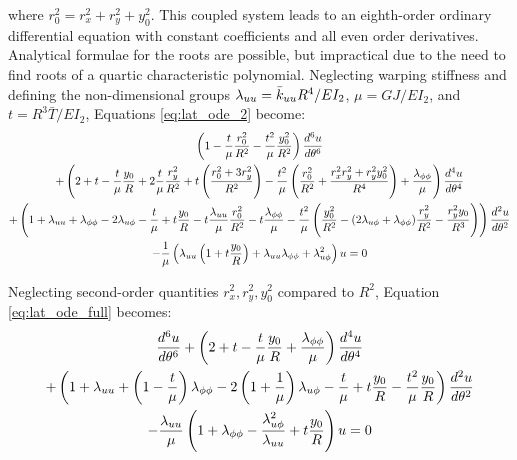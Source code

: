 \documentclass[\rootdir/thesis.tex]{subfiles}
\begin{document}
where $r_0^2 = r_x^2+r_y^2+y_0^2$. This coupled system leads to an eighth-order ordinary differential equation with constant coefficients and all even order derivatives. Analytical formulae for the roots are possible, but impractical due to the need to find roots of a quartic characteristic polynomial. Neglecting warping stiffness and defining the non-dimensional groups $\lambda_{uu}=\bar{k}_{uu} R^4/EI_2$, $\mu=GJ/EI_2$, and $t=R^3\bar{T}/EI_2$, Equations \eqref{eq:lat_ode_2} become:
\begin{multline}
\label{eq:lat_ode_full}
  \left(1-\frac{t}{\mu}\frac{r_0^2}{R^2} - \frac{t^2}{\mu}\frac{y_0^2}{R^2}\right)\frac{d^6u}{d\theta^6}\\
  +\left(2+t-\frac{t}{\mu}\frac{y_0}{R} + 2\frac{t}{\mu}\frac{r_y^2}{R^2}
         +t\left(\frac{r_0^2 + 3r_y^2}{R^2}\right)
         -\frac{t^2}{\mu}\left(\frac{r_0^2}{R^2}+\frac{r_x^2r_y^2+r_y^2y_0^2}{R^4}\right)
         +\frac{\lambda_{\phi\phi}}{\mu}\right) \frac{d^4u}{d\theta^4}\\
  +\left(1+\lambda_{uu}+\lambda_{\phi\phi}-2\lambda_{u\phi}
         -\frac{t}{\mu}+t\frac{y_0}{R}-t\frac{\lambda_{uu}}{\mu}\frac{r_0^2}{R^2}
         -t\frac{\lambda_{\phi\phi}}{\mu}
         -\frac{t^2}{\mu}\left(\frac{y_0^2}{R^2}-(2\lambda_{u\phi}+\lambda_{\phi\phi})\frac{r_y^2}{R^2} - \frac{r_y^2y_0}{R^3}\right)
         \right)\frac{d^2u}{d\theta^2}\\
  -\frac{1}{\mu}\left(\lambda_{uu}\left(1+t\frac{y_0}{R}\right)
                      +\lambda_{uu}\lambda_{\phi\phi} + \lambda_{u\phi}^2\right)u = 0
\end{multline}

Neglecting second-order quantities $r_x^2,r_y^2,y_0^2$ compared to $R^2$, Equation \eqref{eq:lat_ode_full} becomes:
\begin{multline}
\label{eq:lat_ode}
  \frac{d^6u}{d\theta^6}
  +\left(2 + t - \frac{t}{\mu}\frac{y_0}{R}
         +\frac{\lambda_{\phi\phi}}{\mu}\right) \frac{d^4u}{d\theta^4}\\
  +\left(1 + \lambda_{uu} + \left(1-\frac{t}{\mu}\right)\lambda_{\phi\phi}
         -2\left(1 + \frac{1}{\mu}\right)\lambda_{u\phi}
         -\frac{t}{\mu}+t\frac{y_0}{R}
         -\frac{t^2}{\mu}\frac{y_0}{R}\right)\frac{d^2u}{d\theta^2}\\
  -\frac{\lambda_{uu}}{\mu}\left(1+\lambda_{\phi\phi}
                                 -\frac{\lambda_{u\phi}^2}{\lambda_{uu}}
                                 +t\frac{y_0}{R}\right)u = 0
\end{multline}
\end{document}
